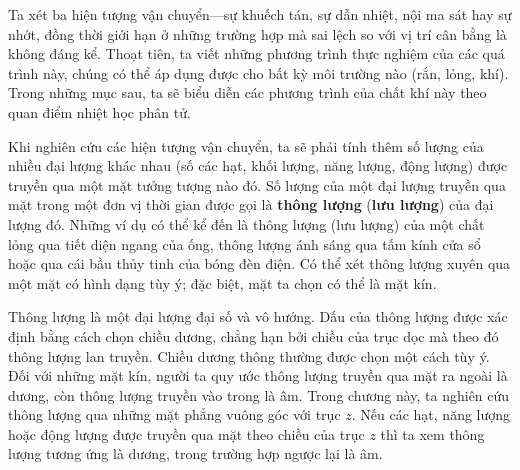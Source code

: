 Ta xét ba hiện tượng vận chuyển---sự khuếch tán, sự dẫn nhiệt, nội ma sát hay sự nhớt, đồng thời giới hạn ở những trường hợp mà sai lệch so với vị trí cân bằng là không đáng kể. Thoạt tiên, ta viết những phương trình thực nghiệm của các quá trình này, chúng có thể áp dụng được cho bất kỳ môi trường nào (rắn, lỏng, khí). Trong những mục sau, ta sẽ biểu diễn các phương trình của chất khí này theo quan điểm nhiệt học phân tử.

Khi nghiên cứu các hiện tượng vận chuyển, ta sẽ phải tính thêm số lượng của nhiều đại lượng khác nhau (số các hạt, khối lượng, năng lượng, động lượng) được truyền qua một mặt tưởng tượng nào đó. Số lượng của một đại lượng truyền qua mặt trong một đơn vị thời gian được gọi là \textbf{thông lượng} (\textbf{lưu lượng}) của đại lượng đó. Những ví dụ có thể kể đến là thông lượng (lưu lượng) của một chất lỏng qua tiết diện ngang của ống, thông lượng ánh sáng qua tấm kính cửa sổ hoặc qua cái bầu thủy tinh của bóng đèn điện. Có thể xét thông lượng xuyên qua một mặt có hình dạng tùy ý; đặc biệt, mặt ta chọn có thể là mặt kín.

Thông lượng là một đại lượng đại số và vô hướng. Dấu của thông lượng được xác định bằng cách chọn chiều dương, chẳng hạn bởi chiều của trục dọc mà theo đó thông lượng lan truyền. Chiều dương thông thường được chọn một cách tùy ý. Đối với những mặt kín, người ta quy ước thông lượng truyền qua mặt ra ngoài là dương, còn thông lượng truyền vào trong là âm. Trong chương này, ta nghiên cứu thông lượng qua những mặt phẳng vuông góc với trục $z$. Nếu các hạt, năng lượng hoặc động lượng được truyền qua mặt theo chiều của trục $z$ thì ta xem thông lượng tương ứng là dương, trong trường hợp ngược lại là âm.

